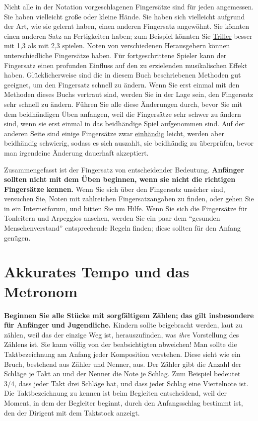 Nicht alle in der Notation vorgeschlagenen Fingersätze sind für jeden angemessen.
Sie haben vielleicht große oder kleine Hände.
Sie haben sich vielleicht aufgrund der Art, wie sie gelernt haben, einen anderen Fingersatz angewöhnt.
Sie könnten einen anderen Satz an Fertigkeiten haben; zum Beispiel könnten Sie \hyperlink{c1iii3}{Triller} besser mit 1,3 als mit 2,3 spielen.
Noten von verschiedenen Herausgebern können unterschiedliche Fingersätze haben.
Für fortgeschrittene Spieler kann der Fingersatz einen profunden Einfluss auf den zu erzielenden musikalischen Effekt haben.	
Glücklicherweise sind die in diesem Buch beschriebenen Methoden gut geeignet, um den Fingersatz schnell zu ändern.
Wenn Sie erst einmal mit den Methoden dieses Buchs vertraut sind, werden Sie in der Lage sein, den Fingersatz sehr schnell zu ändern.
Führen Sie alle diese Änderungen durch, bevor Sie mit dem beidhändigen Üben anfangen, weil die Fingersätze sehr schwer zu ändern sind, wenn sie erst einmal in das beidhändige Spiel aufgenommen sind.
Auf der anderen Seite sind einige Fingersätze zwar \hyperlink{c1ii7}{einhändig} leicht, werden aber beidhändig schwierig, sodass es sich auszahlt, sie beidhändig zu überprüfen, bevor man irgendeine Änderung dauerhaft akzeptiert.

Zusammengefasst ist der Fingersatz von entscheidender Bedeutung. 
\textbf{Anfänger sollten nicht mit dem Üben beginnen, wenn sie nicht die richtigen Fingersätze kennen.}
Wenn Sie sich über den Fingersatz unsicher sind, versuchen Sie, Noten mit zahlreichen Fingersatzangaben zu finden, oder gehen Sie in ein Internetforum, und bitten Sie um Hilfe.
Wenn Sie sich die Fingersätze für Tonleitern und Arpeggios ansehen, werden Sie ein paar dem \enquote{gesunden Menschenverstand} entsprechende Regeln finden; diese sollten für den Anfang genügen.


\section{Akkurates Tempo und das Metronom}\hypertarget{c1ii19}{}

\textbf{Beginnen Sie alle Stücke mit sorgfältigem Zählen; das gilt insbesondere für Anfänger und Jugendliche.}
Kindern sollte beigebracht werden, laut zu zählen, weil das der einzige Weg ist, herauszufinden, was \textit{ihre}  Vorstellung des Zählens ist.
Sie kann völlig von der beabsichtigten abweichen!
Man sollte die Taktbezeichnung am Anfang jeder Komposition verstehen.
Diese sieht wie ein Bruch, bestehend aus Zähler und Nenner, aus.
Der Zähler gibt die Anzahl der Schläge je Takt an und der Nenner die Note je Schlag.
Zum Beispiel bedeutet 3/4, dass jeder Takt drei Schläge hat, und dass jeder Schlag eine Viertelnote ist.
Die Taktbezeichnung zu kennen ist beim Begleiten entscheidend, weil der Moment, in dem der Begleiter beginnt, durch den Anfangsschlag bestimmt ist, den der Dirigent mit dem Taktstock anzeigt.

